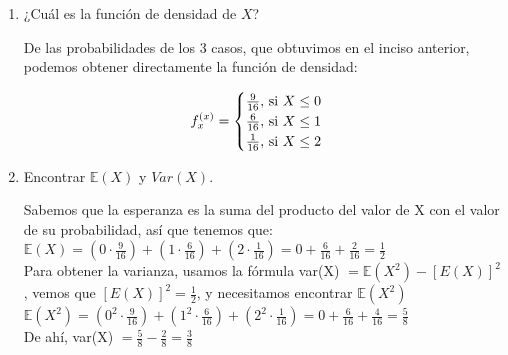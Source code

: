 \documentclass[12pt,a4paper]{report}
\begin{document}
\begin{enumerate}
{\begin{enumerate}
{					Entonces, encontramos la función de distribución sumando las probabilidades de los casos cuando se vayan acumulando:
					
					\[
				F_{x}^{(x)} = \begin{cases}
								\frac{9}{16}, $ si $ X \leq 0\\
								\frac{15}{16}, $ si $ X \leq 1\\
								1, $ si $ X \leq 2\\
						 	 \end{cases}
			\]
										
					
				}

				\item {
					¿Cuál es la función de densidad de $X$?
					
					De las probabilidades de los 3 casos, que obtuvimos en el inciso anterior, podemos obtener directamente la función de densidad:
					
					\[
				f_{x}^{(x)} = \begin{cases}
								\frac{9}{16}, $ si $ X \leq 0\\
								\frac{6}{16}, $ si $ X \leq 1\\
								\frac{1}{16}, $ si $ X \leq 2\\
						 	 \end{cases}
			\]
			
				}

				\item {
					Encontrar $\mathbb{E}(X)$ y $Var(X)$.
					
					Sabemos que la esperanza es la suma del producto del valor de X con el valor de su probabilidad, así que tenemos que:\\
					
					$\mathbb{E}(X) = (0 \cdot \frac{9}{16}) + (1 \cdot \frac{6}{16}) + (2 \cdot \frac{1}{16}) = 0 + \frac{6}{16} + \frac{2}{16} = \frac{1}{2}$\\
					
					Para obtener la varianza, usamos la fórmula var(X) $= \mathbb{E}(X^2) - [E(X)]^2$, vemos que $[E(X)]^2 = \frac{1}{2}$, y necesitamos encontrar $\mathbb{E}(X^2)$\\
					
					$\mathbb{E}(X^2) =(0^2 \cdot \frac{9}{16}) + (1^2 \cdot \frac{6}{16}) + (2^2 \cdot \frac{1}{16}) = 0 + \frac{6}{16} + \frac{4}{16} = \frac{5}{8} $\\
					
					De ahí, var(X) $= \frac{5}{8} - \frac{2}{8} = \frac{3}{8}$
				}
			\end{enumerate}
		}


\end{enumerate}
\end{document}
